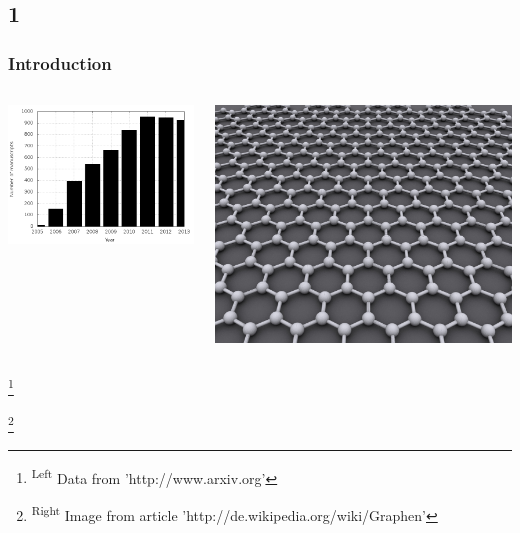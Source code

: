 \documentclass{beamer}
\newcommand\blfootnote[1]{%
  \begingroup
  \renewcommand\thefootnote{}\footnote{#1}%
  \addtocounter{footnote}{-1}%
  \endgroup
}
\begin{document}
	\subsection*{1}
		\begin{frame}
			\frametitle{Introduction}
			\centering
			\begin{columns}[T] %
				\begin{column}{.48\textwidth}
					\includegraphics[width=1.2\textwidth]{figures/grapheneManuscripts.png}
				\end{column}%
				\hfill%
				\begin{column}{.48\textwidth}
					\includegraphics[width=\textwidth]{figures/Graphen.jpg}
				\end{column}%
			\end{columns}
			\blfootnote{\textsuperscript{Left} Data from 'http://www.arxiv.org' }
			\blfootnote{\textsuperscript{Right} Image from article 'http://de.wikipedia.org/wiki/Graphen'}			
		\end{frame}
		
\end{document}
